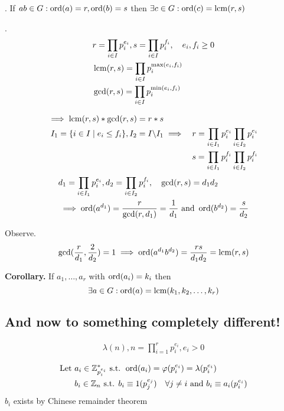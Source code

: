 \Theorem.
If $ab \in G: \operatorname{ord}(a)=r, \operatorname{ord}(b) = s$ then $\exists c \in G: \operatorname{ord}(c) = \operatorname{lcm}(r,s)$

\Proof.
\begin{align*}
  &r = \prod_{i\in I} p_i^{e_i}, s = \prod_{i\in I} p_i^{f_i}, \quad  e_i, f_i \geq 0\\
  &\operatorname{lcm}(r,s) = \prod_{i\in I} p_i^{\max(e_i,f_i)}\\
  &\gcd(r,s) = \prod_{i\in I} p_i^{\min(e_i,f_i)}
\end{align*}

\begin{align*}
  \implies \operatorname{lcm}(r,s) * \gcd(r,s) = r*s\\
  I_1 = \{i \in I \mid e_i \leq f_i\}, I_2 = I \backslash I_1
  & \implies
     & r = \prod_{i\in I_1} p_i^{e_i} \prod_{i\in I_2} p_i^{e_i} \\
    && s = \prod_{i\in I_1} p_i^{f_i} \prod_{i\in I_2} p_i^{f_i} \\
\end{align*}
\begin{align*}
  &d_1 = \prod_{i\in I_1} p_i^{e_i}, d_2 = \prod_{i\in I_2} p_i^{f_i}, \quad \gcd(r,s) = d_1 d_2 \\
  &\implies \operatorname{ord}(a^{d_1}) = \frac{r}{\gcd(r,d_1)} = \frac{1}{d_1} \text{ and } \operatorname{ord}(b^{d_2}) = \frac{s}{d_2}
\end{align*}

Observe.
\begin{align*}
  \gcd(\frac{r}{d_1}, \frac{2}{d_2} ) = 1
    \implies \operatorname{ord}(a^{d_1} b^{d_2}) =
    \frac{rs}{d_1 d_2} = \operatorname{lcm}(r,s)
\end{align*}

\textbf{Corollary.}
If $a_1, \ldots, a_r$ with $\operatorname{ord}(a_i) = k_i$ then
\[
  \exists a \in G: \operatorname{ord}(a) = \operatorname{lcm}(k_1, k_2, \ldots, k_r)
\]


\subsection{And now to something completely different!}
\begin{align*}
  \lambda(n), n = \prod_{i = 1}^{r} p_i^{e_i}, e_i > 0
\end{align*}

\begin{align*}
\text{Let } &a_i \in \mathbb{Z}_{p_i^{e_i}}^{*} \text{ s.t. } \operatorname{ord}(a_i) = \varphi(p_i^{e_i}) = \lambda(p_i^{e_i})\\
  &b_i \in \mathbb{Z}_n \text{ s.t. } b_i \equiv 1 (p_j^{e_j}) \quad \forall j \neq i \text{ and } b_i \equiv a_i (p_i^{e_i})
\end{align*}
$b_i$ exists by Chinese remainder theorem

